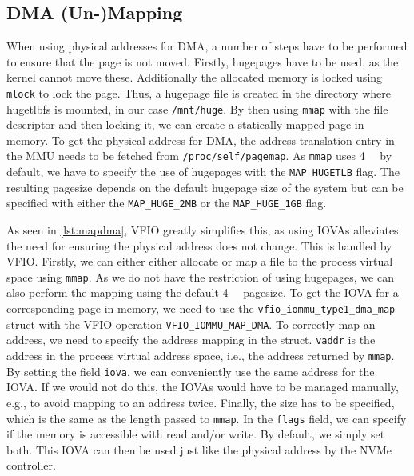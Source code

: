 \subsection{DMA (Un-)Mapping}\label{sec:dmamapping}
When using physical addresses for DMA, a number of steps have to be performed to ensure that the page is not moved. Firstly, hugepages have to be used, as the kernel cannot move these. Additionally the allocated memory is locked using \texttt{mlock} to lock the page. Thus, a hugepage file is created in the directory where hugetlbfs is mounted, in our case \texttt{/mnt/huge}. By then using \texttt{mmap} with the file descriptor and then locking it, we can create a statically mapped page in memory. To get the physical address for DMA, the address translation entry in the MMU needs to be fetched from \texttt{/proc/self/pagemap}. As \texttt{mmap} uses \qty{4}{\kibi\byte} by default, we have to specify the use of hugepages with the \texttt{MAP\_HUGETLB} flag. The resulting pagesize depends on the default hugepage size of the system but can be specified with either the \texttt{MAP\_HUGE\_2MB} or the \texttt{MAP\_HUGE\_1GB} flag.

As seen in \autoref{lst:mapdma}, VFIO greatly simplifies this, as using IOVAs alleviates the need for ensuring the physical address does not change. This is handled by VFIO. Firstly, we can either either allocate or map a file to the process virtual space using \texttt{mmap}. As we do not have the restriction of using hugepages, we can also perform the mapping using the default \qty{4}{\kibi\byte} pagesize.
To get the IOVA for a corresponding page in memory, we need to use the \texttt{vfio\_iommu\_type1\_dma\_map} struct with the VFIO operation \texttt{VFIO\_IOMMU\_MAP\_DMA}. To correctly map an address, we need to specify the address mapping in the struct. \texttt{vaddr} is the address in the process virtual address space, i.e., the address returned by \texttt{mmap}. By setting the field \texttt{iova}, we can conveniently use the same address for the IOVA. If we would not do this, the IOVAs would have to be managed manually, e.g., to avoid mapping to an address twice. Finally, the size has to be specified, which is the same as the length passed to \texttt{mmap}. In the \texttt{flags} field, we can specify if the memory is accessible with read and/or write. By default, we simply set both. This IOVA can then be used just like the physical address by the NVMe controller.

